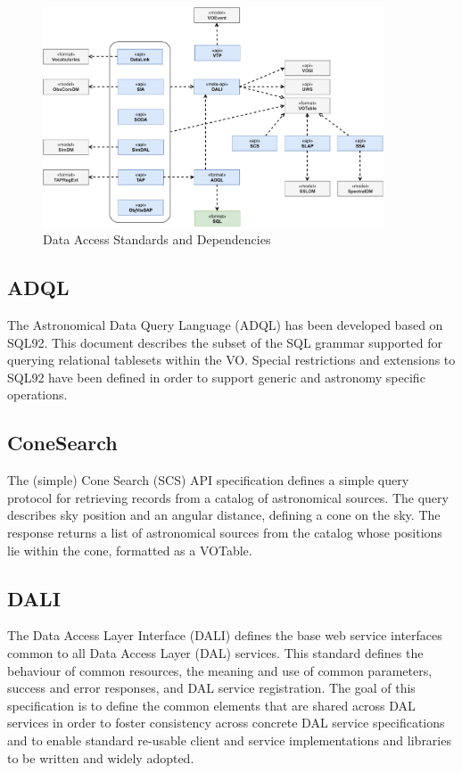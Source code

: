 \documentclass[11pt,a4paper]{ivoa}
\begin{document}
\begin{figure}[h]
\centering
\includegraphics[width=0.90\textwidth]{ivoa-arch-dal.pdf}
\caption{Data Access Standards and Dependencies}
\label{fig:daldeps}
\end{figure}


\subsection{ADQL}

The Astronomical Data Query Language (ADQL) \citep{2008ivoa.spec.1030O} has been developed based on SQL92. This document 
describes the subset of the SQL grammar supported for querying relational tablesets within the VO. Special restrictions and 
extensions to SQL92 have been defined in order to support generic and astronomy 
specific operations. 

\subsection{ConeSearch}

The (simple) Cone Search (SCS) \citep{2008ivoa.specQ0222P} API specification defines a simple query protocol for retrieving 
records from a catalog of astronomical sources. The query describes sky position and an 
angular distance, defining a cone on the sky. The response returns a list of astronomical 
sources from the catalog whose positions lie within the cone, formatted as a VOTable. 

\subsection{DALI}
\label{dal:dali}

The Data Access Layer Interface (DALI) \citep{2017ivoa.spec.0517D} defines the base web service interfaces common to all Data 
Access Layer (DAL) services. This standard defines the behaviour of common resources, the 
meaning and use of common parameters, success and error responses, and DAL service 
registration. The goal of this specification is to define the common elements that are 
shared across DAL services in order to foster consistency across concrete DAL service 
specifications and to enable standard re-usable client and service implementations and 
libraries to be written and widely adopted. 
\end{document}

